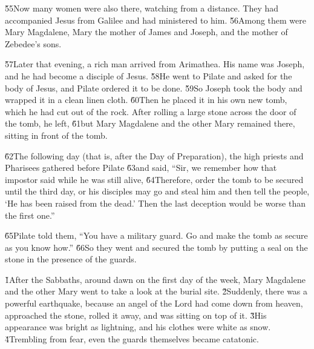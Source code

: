 \v{55}Now many women were also there, watching from a distance. They had accompanied Jesus from Galilee and had ministered to him. \v{56}Among them were Mary Magdalene, Mary the mother of James and Joseph, and the mother of Zebedee's sons.

\v{57}Later that evening, a rich man arrived from Arimathea. His name was Joseph, and he had become a disciple of Jesus. \v{58}He went to Pilate and asked for the body of Jesus, and Pilate ordered it to be done. \v{59}So Joseph took the body and wrapped it in a clean linen cloth. \v{60}Then he placed it in his own new tomb, which he had cut out of the rock. After rolling a large stone across the door of the tomb, he left, \v{61}but Mary Magdalene and the other Mary remained there, sitting in front of the tomb.

\v{62}The following day (that is, after the Day of Preparation), the high priests and Pharisees gathered before Pilate \v{63}and said, ``Sir, we remember how that impostor said while he was still alive,  \v{64}Therefore, order the tomb to be secured until the third day, or his disciples may go and steal him and then tell the people, `He has been raised from the dead.' Then the last deception would be worse than the first one.''

\v{65}Pilate told them, ``You have a military guard. Go and make the tomb as secure as you know how.'' \v{66}So they went and secured the tomb by putting a seal on the stone in the presence of the guards.

\v{1}After the Sabbaths, around dawn on the first day of the week, Mary Magdalene and the other Mary went to take a look at the burial site. \v{2}Suddenly, there was a powerful earthquake, because an angel of the Lord had come down from heaven, approached the stone, rolled it away, and was sitting on top of it. \v{3}His appearance was bright as lightning, and his clothes were white as snow. \v{4}Trembling from fear, even the guards themselves became catatonic.

